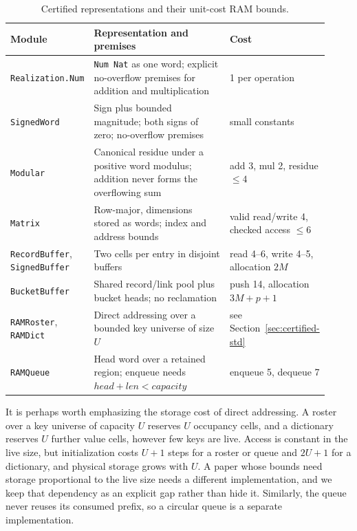 \documentclass[acmsmall,nonacm]{acmart}
\begin{document}
\begin{table}[t]
\caption{Certified representations and their unit-cost RAM bounds.}\label{tab:representations}
\small
\begin{tabular}{@{}p{0.22\linewidth}p{0.44\linewidth}p{0.26\linewidth}@{}}
\toprule
Module & Representation and premises & Cost \\
\midrule
\texttt{Realization.Num} & \texttt{Num Nat} as one word; explicit no-overflow premises for addition and multiplication & 1 per operation \\
\texttt{SignedWord} & Sign plus bounded magnitude; both signs of zero; no-overflow premises & small constants \\
\texttt{Modular} & Canonical residue under a positive word modulus; addition never forms the overflowing sum & add 3, mul 2, residue $\le 4$ \\
\texttt{Matrix} & Row-major, dimensions stored as words; index and address bounds & valid read/write 4, checked access $\le 6$ \\
\texttt{RecordBuffer}, \texttt{SignedBuffer} & Two cells per entry in disjoint buffers & read 4--6, write 4--5, allocation $2M$ \\
\texttt{BucketBuffer} & Shared record/link pool plus bucket heads; no reclamation & push 14, allocation $3M+p+1$ \\
\texttt{RAMRoster}, \texttt{RAMDict} & Direct addressing over a bounded key universe of size $U$ & see Section~\ref{sec:certified-std} \\
\texttt{RAMQueue} & Head word over a retained region; enqueue needs $\mathit{head} + \mathit{len} < \mathit{capacity}$ & enqueue 5, dequeue 7 \\
\bottomrule
\end{tabular}
\end{table}

It is perhaps worth emphasizing the storage cost of direct addressing.
A roster over a key universe of capacity $U$ reserves $U$ occupancy cells, and a dictionary reserves $U$ further value cells, however few keys are live.
Access is constant in the live size, but initialization costs $U+1$ steps for a roster or queue and $2U+1$ for a dictionary, and physical storage grows with $U$.
A paper whose bounds need storage proportional to the live size needs a different implementation, and we keep that dependency as an explicit gap rather than hide it.
Similarly, the queue never reuses its consumed prefix, so a circular queue is a separate implementation.
\end{document}
